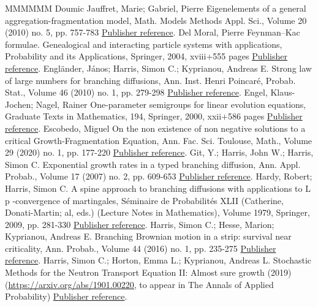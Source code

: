 \documentclass[11pt]{article}
\theoremstyle{definition}
\numberwithin{equation}{section}
\numberwithin{figure}{section}
\numberwithin{table}{section}
\begin{document}
\begin{thebibliography}{MMMMMM}
 Doumic Jauffret, Marie; Gabriel, Pierre Eigenelements of a general aggregation-fragmentation model, Math. Models Methods Appl. Sci., Volume 20 (2010) no. 5, pp. 757-783 \href{https://ahl.centre-mersenne.org/item/AHL_2020__3__795_0/#DoumGab}{Publisher reference}.
 Del Moral, Pierre Feynman–Kac formulae. Genealogical and interacting particle systems with applications, Probability and its Applications, Springer, 2004, xviii+555 pages \href{https://ahl.centre-mersenne.org/item/AHL_2020__3__795_0/#Delmoral}{Publisher reference}.
 Engländer, János; Harris, Simon C.; Kyprianou, Andreas E. Strong law of large numbers for branching diffusions, Ann. Inst. Henri Poincaré, Probab. Stat., Volume 46 (2010) no. 1, pp. 279-298 \href{https://ahl.centre-mersenne.org/item/AHL_2020__3__795_0/#EnHaKy}{Publisher reference}.
 Engel, Klaus-Jochen; Nagel, Rainer One-parameter semigroups for linear evolution equations, Graduate Texts in Mathematics, 194, Springer, 2000, xxii+586 pages \href{https://ahl.centre-mersenne.org/item/AHL_2020__3__795_0/#EN00}{Publisher reference}.
 Escobedo, Miguel On the non existence of non negative solutions to a critical Growth-Fragmentation Equation, Ann. Fac. Sci. Toulouse, Math., Volume 29 (2020) no. 1, pp. 177-220 \href{https://ahl.centre-mersenne.org/item/AHL_2020__3__795_0/#Esco}{Publisher reference}.
 Git, Y.; Harris, John W.; Harris, Simon C. Exponential growth rates in a typed branching diffusion, Ann. Appl. Probab., Volume 17 (2007) no. 2, pp. 609-653 \href{https://ahl.centre-mersenne.org/item/AHL_2020__3__795_0/#GiHaHa}{Publisher reference}.
 Hardy, Robert; Harris, Simon C. A spine approach to branching diffusions with applications to L p -convergence of martingales, Séminaire de Probabilités XLII (Catherine, Donati-Martin; al, eds.) (Lecture Notes in Mathematics), Volume 1979, Springer, 2009, pp. 281-330 \href{https://ahl.centre-mersenne.org/item/AHL_2020__3__795_0/#HaHa}{Publisher reference}.
 Harris, Simon C.; Hesse, Marion; Kyprianou, Andreas E. Branching Brownian motion in a strip: survival near criticality, Ann. Probab., Volume 44 (2016) no. 1, pp. 235-275 \href{https://ahl.centre-mersenne.org/item/AHL_2020__3__795_0/#HaHeKy}{Publisher reference}.
 Harris, Simon C.; Horton, Emma L.; Kyprianou, Andreas L. Stochastic Methods for the Neutron Transport Equation II: Almost sure growth (2019) (\url{https://arxiv.org/abs/1901.00220,} to appear in The Annals of Applied Probability) \href{https://ahl.centre-mersenne.org/item/AHL_2020__3__795_0/#HHK}{Publisher reference}.

\end{thebibliography}
\end{document}
